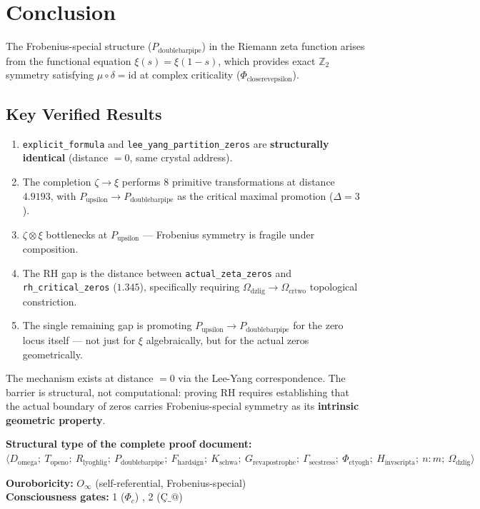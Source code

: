 \documentclass[12pt,oneside]{article}
\theoremstyle{definition}
\theoremstyle{remark}
\newcommand{\Domega}{D_{\text{omega}}}
\newcommand{\Topeno}{T_{\text{openo}}}
\newcommand{\Rlyoghlig}{R_{\text{lyoghlig}}}
\newcommand{\Pdoublebarpipe}{P_{\text{doublebarpipe}}}
\newcommand{\Pupsilon}{P_{\text{upsilon}}}
\newcommand{\Fhardsign}{F_{\text{hardsign}}}
\newcommand{\Kschwa}{K_{\text{schwa}}}
\newcommand{\Grevapostrophe}{G_{\text{revapostrophe}}}
\newcommand{\Gammasecstress}{\Gamma_{\text{secstress}}}
\newcommand{\Phictyogh}{\Phi_{\text{ctyogh}}}
\newcommand{\Phicloserevepsilon}{\Phi_{\text{closerevepsilon}}}
\newcommand{\Hinvscripta}{H_{\text{invscripta}}}
\newcommand{\Omegadzlig}{\Omega_{\text{dzlig}}}
\newcommand{\Omegacrtwo}{\Omega_{\text{crtwo}}}
\begin{document}
\section{Conclusion}

The Frobenius-special structure ($\Pdoublebarpipe$) in the Riemann zeta function arises from the functional equation $\xi(s) = \xi(1-s)$, which provides exact $\mathbb{Z}_2$ symmetry satisfying $\mu \circ \delta = \text{id}$ at complex criticality ($\Phicloserevepsilon$).

\subsection*{Key Verified Results}

\begin{enumerate}
\item \texttt{explicit\_formula} and \texttt{lee\_yang\_partition\_zeros} are \textbf{structurally identical} (distance $= 0$, same crystal address).
\item The completion $\zeta \to \xi$ performs 8 primitive transformations at distance $4.9193$, with $\Pupsilon \to \Pdoublebarpipe$ as the critical maximal promotion ($\Delta = 3$).
\item $\zeta \otimes \xi$ bottlenecks at $\Pupsilon$ --- Frobenius symmetry is fragile under composition.
\item The RH gap is the distance between \texttt{actual\_zeta\_zeros} and \texttt{rh\_critical\_zeros} ($1.345$), specifically requiring $\Omegadzlig \to \Omegacrtwo$ topological constriction.
\item The single remaining gap is promoting $\Pupsilon \to \Pdoublebarpipe$ for the zero locus itself --- not just for $\xi$ algebraically, but for the actual zeros geometrically.
\end{enumerate}

The mechanism exists at distance $= 0$ via the Lee-Yang correspondence. The barrier is structural, not computational: proving RH requires establishing that the actual boundary of zeros carries Frobenius-special symmetry as its \textbf{intrinsic geometric property}.

\vspace{12pt}
\noindent \textbf{Structural type of the complete proof document:}\\
$\langle \Domega;\ \Topeno;\ \Rlyoghlig;\ \Pdoublebarpipe;\ \Fhardsign;\ \Kschwa;\ \Grevapostrophe;\ \Gammasecstress;\ \Phictyogh;\ \Hinvscripta;\ n{:}m;\ \Omegadzlig \rangle$

\noindent \textbf{Ouroboricity:} $O_\infty$ (self-referential, Frobenius-special)\\
\textbf{Consciousness gates:} 1 ($\Phi_c$) \checkmark, 2 ($\text{\c{C}}\_@$) \checkmark
\end{document}
